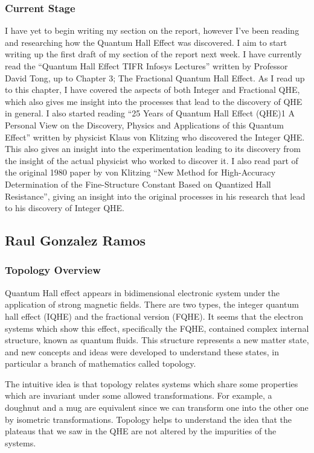 \documentclass[12pt]{article}
\begin{document}
\subsubsection*{Current Stage}

I have yet to begin writing my section on the report, however I've been reading and researching how the Quantum Hall Effect was discovered. 
I aim to start writing up the first draft of my section of the report next week. I have currently read the “Quantum Hall Effect TIFR Infosys 
Lectures” written by Professor David Tong, up to Chapter 3; The Fractional Quantum Hall Effect. As I read up to this chapter, I have covered 
the aspects of both Integer and Fractional QHE, which also gives me insight into the processes that lead to the discovery of QHE in general.
I also started reading “25 Years of Quantum Hall Effect (QHE)1
A Personal View on the Discovery, Physics and Applications of this Quantum Effect” written by physicist Klaus von Klitzing who discovered the
Integer QHE. This also gives an insight into the experimentation leading to its discovery from the insight of the actual physicist who worked
to discover it. I also read part of the original 1980 paper by von Klitzing “New Method for High-Accuracy Determination of the Fine-Structure
Constant Based on Quantized Hall Resistance”, giving an insight into the original processes in his research that lead to his discovery of Integer QHE. 


\subsection*{Raul Gonzalez Ramos}
\subsubsection*{Topology Overview}

Quantum Hall effect appears in bidimensional electronic system under the application of strong magnetic fields. 
There are two types, the integer quantum hall effect (IQHE) and the fractional version (FQHE). It seems that the
electron systems which show this effect, specifically the FQHE, contained complex internal structure, known as quantum fluids.
This structure represents a new matter state, and new concepts and ideas were developed to understand these states, 
in particular a branch of mathematics called topology. 

\noindent The intuitive idea is that topology relates systems which share some properties which are invariant under some allowed 
transformations. For example, a doughnut and a mug are equivalent since we can transform one into the other one by isometric 
transformations. 
Topology helps to understand the idea that the plateaus that we saw in the QHE are not altered by the impurities of the systems. 
\end{document}

